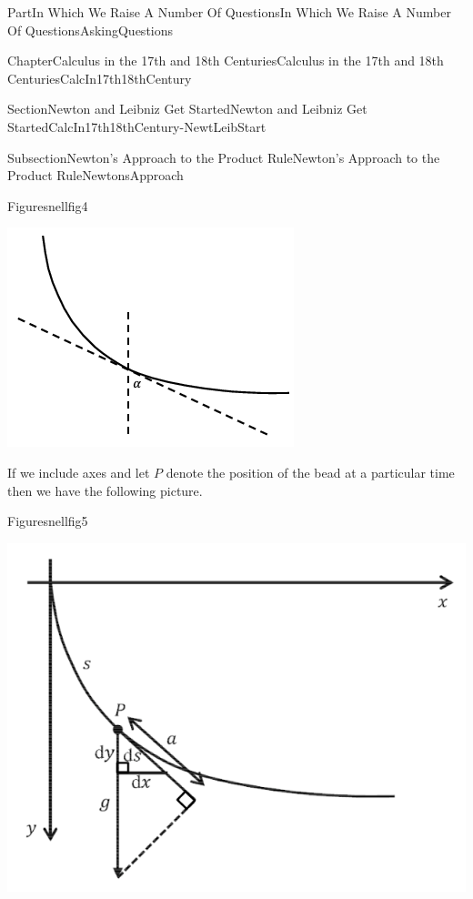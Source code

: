 \documentclass[oneside,10pt,]{book}
\numberwithin{equation}{part}
\begin{document}
\begin{partptx}{Part}{In Which We Raise A Number Of Questions}{}{In Which We Raise A Number Of Questions}{}{}{AskingQuestions}
\begin{chapterptx}{Chapter}{Calculus in the 17th and 18th Centuries}{}{Calculus in the 17th and 18th Centuries}{}{}{CalcIn17th18thCentury}
\begin{sectionptx}{Section}{Newton and Leibniz Get Started}{}{Newton and Leibniz Get Started}{}{}{CalcIn17th18thCentury-NewtLeibStart}
\begin{subsectionptx}{Subsection}{Newton's Approach to the Product Rule}{}{Newton's Approach to the Product Rule}{}{}{NewtonsApproach}
\begin{figureptx}{Figure}{}{snellfig4}{}
\begin{image}{0.25}{0.5}{0.25}{}
\includegraphics[width=\linewidth]{external/images/snellfig4.png}
\end{image}%
\tcblower
\end{figureptx}%
If we include axes and let \(P\) denote the position of the bead at a particular time then we have the following picture.%
\begin{figureptx}{Figure}{}{snellfig5}{}%
\begin{image}{0.125}{0.75}{0.125}{}%
\includegraphics[width=\linewidth]{external/images/snellfig5.png}
\end{image}%
\tcblower
\end{figureptx}%

\end{subsectionptx}
\end{sectionptx}
\end{chapterptx}
\end{partptx}
\end{document}
